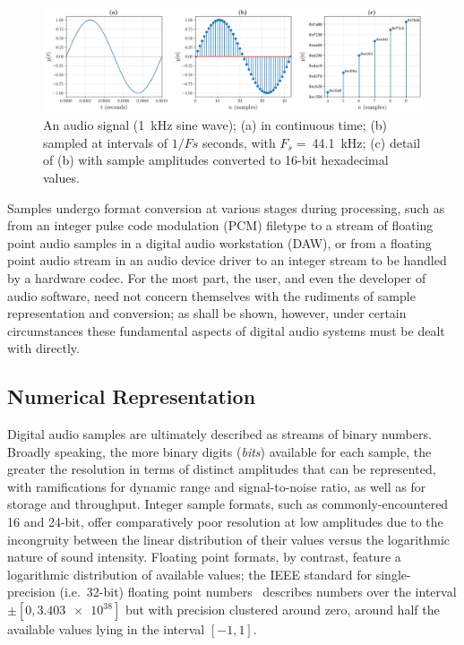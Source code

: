 \begin{figure}[ht]
    \centering
    \includegraphics[width=\textwidth]{figures/digital-signal}
    \caption{
        An audio signal (\qty{1}{\kHz} sine wave);
        (a) in continuous time;
        (b) sampled at intervals of $1/Fs$ seconds, with $F_s=~$\qty{44.1}{\kHz};
        (c) detail of (b) with sample amplitudes converted to 16-bit hexadecimal
        values.
    }
    \label{fig:signal-samples}
\end{figure}

Samples undergo format conversion at various stages during processing, such as
from an integer pulse code modulation (PCM) filetype to a stream of floating
point audio samples in a digital audio workstation (DAW), or from a floating
point audio stream in an audio device driver to an integer stream to be handled
by a hardware codec.
For the most part, the user, and even the developer of audio software, need not
concern themselves with the rudiments of sample representation and conversion;
as shall be shown, however, under certain circumstances these fundamental
aspects of digital audio systems must be dealt with directly.

\subsection{Numerical Representation}\label{subsec:numerical-representation}

Digital audio samples are ultimately described as streams of binary numbers.
Broadly speaking, the more binary digits (\textit{bits}) available for each
sample, the greater the resolution in terms of distinct amplitudes that can be
represented, with ramifications for dynamic range and signal-to-noise ratio, as
well as for storage and throughput.
Integer sample formats, such as commonly-encountered 16 and 24-bit, offer
comparatively poor resolution at low amplitudes due to the incongruity between
the linear distribution of their values versus the logarithmic nature of sound
intensity.
Floating point formats, by contrast, feature a logarithmic distribution of
available values; the IEEE standard for single-precision (i.e.\ 32-bit) floating
point numbers~\citep{ieee_ieee_1985} describes numbers over the interval
$\pm[0,\num{3.403e38}]$ but with precision clustered around zero, around half
the available values lying in the interval $[-1, 1]$.

